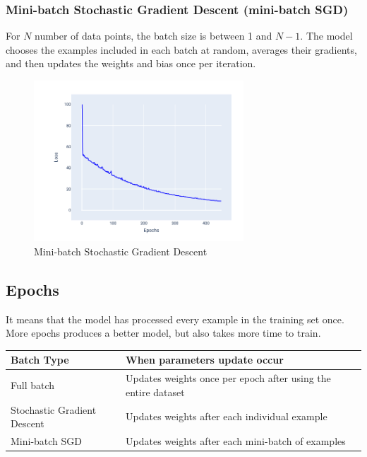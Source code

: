 \documentclass[a4paper,12pt]{article}
\begin{document}
\subsubsection{Mini-batch Stochastic Gradient Descent (mini-batch SGD)}
For $N$ number of data points, the batch size is between 1 and $N-1$.  The model chooses the examples included in each batch at random, averages their gradients, and then updates the weights and bias once per iteration.

\begin{figure}[H]
    \centering
    \includegraphics[width=0.7\textwidth]{../Images/Linear-Regression/mini-batch-sgd.png}
    \caption{Mini-batch Stochastic Gradient Descent}
    \label{fig:mini-batch-sgd}
\end{figure}

\subsection{Epochs}
It means that the model has processed every example in the training set once. More epochs produces a better model, but also takes more time to train.

\begin{center}
\begin{tabularx}{\textwidth}{@{}lXl@{}}
\toprule
Batch Type & When parameters update occur \\ 
\midrule
Full batch & Updates weights once per epoch after using the entire dataset  \\
Stochastic Gradient Descent & Updates weights after each individual example \\
Mini-batch SGD & Updates weights after each mini-batch of examples \\
\bottomrule
\end{tabularx}
\end{center}
\end{document}
